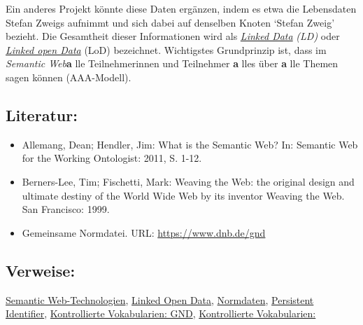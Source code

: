 \documentclass{article}
\begin{document}
        Ein anderes Projekt könnte diese Daten ergänzen, indem es etwa die Lebensdaten
                  Stefan Zweigs aufnimmt und sich dabei auf denselben Knoten ‘Stefan Zweig’ bezieht.
                  Die Gesamtheit dieser Informationen wird als \emph{\href{http://gams.uni-graz.at/o:konde.8}{Linked Data}}\emph{ (LD)} oder \emph{\href{http://gams.uni-graz.at/o:konde.8}{Linked open Data}} (LoD) bezeichnet. Wichtigstes Grundprinzip ist, dass im \emph{Semantic Web}\textbf{a} lle Teilnehmerinnen und Teilnehmer \textbf{a} lles über \textbf{a} lle Themen sagen können (AAA-Modell).\\
            
        \subsection*{Literatur:}\begin{itemize}\item Allemang, Dean; Hendler, Jim: What is the Semantic Web? In: Semantic Web for the Working Ontologist: 2011, S. 1-12.\item Berners-Lee, Tim; Fischetti, Mark: Weaving the Web: the original design and ultimate
                              destiny of the World Wide Web by its inventor Weaving the Web. San Francisco: 1999.\item Gemeinsame Normdatei. URL: \url{https://www.dnb.de/gnd}\end{itemize}\subsection*{Verweise:}\href{https://gams.uni-graz.at/o:konde.168}{Semantic Web-Technologien}, \href{https://gams.uni-graz.at/o:konde.8}{Linked Open Data}, \href{https://gams.uni-graz.at/o:konde.147}{Normdaten}, \href{https://gams.uni-graz.at/o:konde.12}{Persistent Identifier}, \href{https://gams.uni-graz.at/o:konde.109}{Kontrollierte Vokabularien:
                           GND}, \href{https://gams.uni-graz.at/o:konde.112}{Kontrollierte Vokabularien:
}
\end{document}
